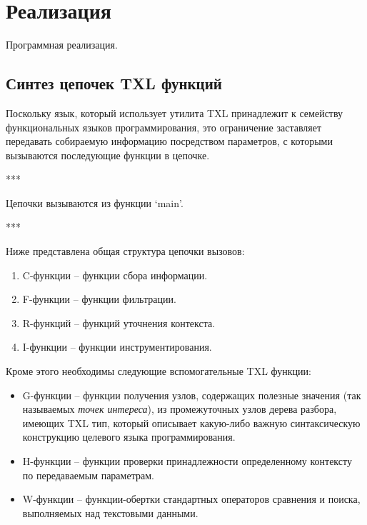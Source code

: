 \chapter{Реализация}

Программная реализация.

\section{Синтез цепочек TXL функций}

Поскольку язык, который использует утилита TXL принадлежит к семейству функциональных языков программирования, это ограничение заставляет передавать собираемую информацию посредством параметров, с которыми вызываются последующие функции в цепочке.

***

Цепочки вызываются из функции `main'.

***

Ниже представлена общая структура цепочки вызовов:
\begin{enumerate}
  \item C-функции -- функции сбора информации.
  \item F-функции -- функции фильтрации.
  \item R-функций -- функций уточнения контекста.
  \item I-функции -- функции инструментирования.
\end{enumerate}

Кроме этого необходимы следующие вспомогательные TXL функции:
\begin{itemize}
  \item G-функции -- функции получения узлов, содержащих полезные значения (так называемых \textit{точек интереса}), из промежуточных узлов дерева разбора, имеющих TXL тип, который описывает какую-либо важную синтаксическую конструкцию целевого языка программирования.
  \item H-функции -- функции проверки принадлежности определенному контексту по передаваемым параметрам.
  \item W-функции -- функции-обертки стандартных операторов сравнения и поиска, выполняемых над текстовыми данными.
\end{itemize}

